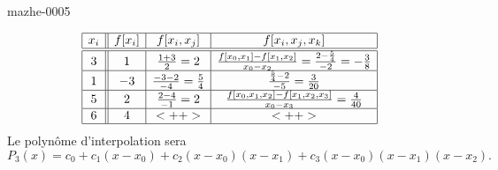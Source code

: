 
\begin{corrige}{mazhe-0005}

    \begin{equation*}
        \begin{array}[]{|c||c|c|c|}
            \hline
            x_i&f[x_i]&f[x_i,x_j]&f[x_i,x_j,x_k]\\
            \hline\hline
            3&1&\frac{ 1+3 }{ 2 }=2&\frac{ f[x_0,x_1]-f[x_1,x_2] }{ x_0-x_2 }=\frac{ 2-\frac{ 5 }{ 4 } }{ -2 }=-\frac{ 3 }{ 8 }\\
            \hline
            1&-3&\frac{ -3-2 }{ -4 }=\frac{ 5 }{ 4 }&\frac{ \frac{ 5 }{ 4 }-2 }{ -5 }=\frac{ 3 }{ 20 }\\
            \hline
            5&2&\frac{ 2-4 }{ -1 }=2&\frac{ f[x_0,x_1,x_2]-f[x_1,x_2,x_3] }{ x_0-x_3 }=\frac{ 4 }{ 40 }\\
            \hline
            6&4&<++>&<++>\\
            \hline
        \end{array}
    \end{equation*}
    Le polynôme d'interpolation sera
    \begin{equation}
        P_3(x)=c_0+c_1(x-x_0)+c_2(x-x_0)(x-x_1)+c_3(x-x_0)(x-x_1)(x-x_2).
    \end{equation}

\end{corrige}

